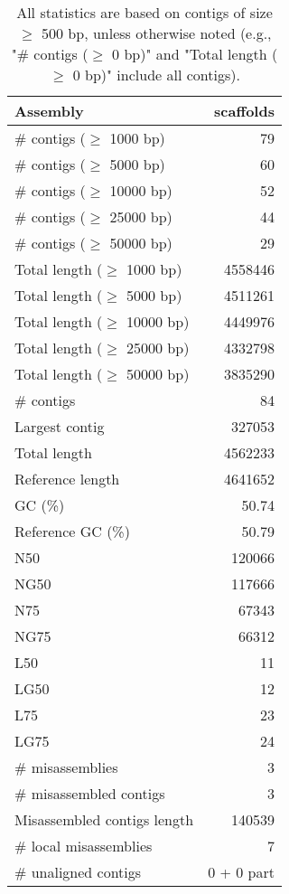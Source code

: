 \documentclass[12pt,a4paper]{article}
\begin{document}
\begin{table}[ht]
\begin{center}
\caption{All statistics are based on contigs of size $\geq$ 500 bp, unless otherwise noted (e.g., "\# contigs ($\geq$ 0 bp)" and "Total length ($\geq$ 0 bp)" include all contigs).}
\begin{tabular}{|l*{1}{|r}|}
\hline
Assembly & scaffolds \\ \hline
\# contigs ($\geq$ 1000 bp) & 79 \\ \hline
\# contigs ($\geq$ 5000 bp) & 60 \\ \hline
\# contigs ($\geq$ 10000 bp) & 52 \\ \hline
\# contigs ($\geq$ 25000 bp) & 44 \\ \hline
\# contigs ($\geq$ 50000 bp) & 29 \\ \hline
Total length ($\geq$ 1000 bp) & 4558446 \\ \hline
Total length ($\geq$ 5000 bp) & 4511261 \\ \hline
Total length ($\geq$ 10000 bp) & 4449976 \\ \hline
Total length ($\geq$ 25000 bp) & 4332798 \\ \hline
Total length ($\geq$ 50000 bp) & 3835290 \\ \hline
\# contigs & 84 \\ \hline
Largest contig & 327053 \\ \hline
Total length & 4562233 \\ \hline
Reference length & 4641652 \\ \hline
GC (\%) & 50.74 \\ \hline
Reference GC (\%) & 50.79 \\ \hline
N50 & 120066 \\ \hline
NG50 & 117666 \\ \hline
N75 & 67343 \\ \hline
NG75 & 66312 \\ \hline
L50 & 11 \\ \hline
LG50 & 12 \\ \hline
L75 & 23 \\ \hline
LG75 & 24 \\ \hline
\# misassemblies & 3 \\ \hline
\# misassembled contigs & 3 \\ \hline
Misassembled contigs length & 140539 \\ \hline
\# local misassemblies & 7 \\ \hline
\# unaligned contigs & 0 + 0 part \\ \hline

\end{tabular}
\end{center}
\end{table}
\end{document}
